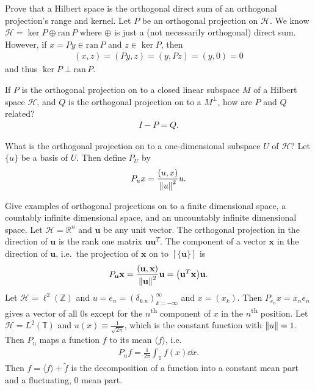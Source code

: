 \documentclass[avery5388,grid,frame]{flashcards}
\newcommand{\ran}{\mathrm{ran}\,}
\def\Rl{\mathbb{R}}
\def\hilb{\mathcal{H}}
\def\torus{\mathbb{T}}
\begin{document}
\begin{flashcard}
    {Prove that a Hilbert space is the orthogonal direct sum of an orthogonal projection's range and kernel.}
    Let $P$ be an orthogonal projection on $\hilb$.  We know $\hilb = \ker P \oplus \ran P$ where $\oplus$ is just a (not necessarily orthogonal) direct sum.  However, if $x = Py \in \ran P$ and $z \in \ker P$, then
    \begin{align*}
        (x, z) = (Py, z) = (y, Pz) = (y, 0) = 0
    \end{align*}
    and thus $\ker P \perp \ran P$.
\end{flashcard}

\begin{flashcard}
    {If $P$ is the orthogonal projection on to a closed linear subspace $M$ of a Hilbert space $\hilb$, and $Q$ is the orthogonal projection on to a $M^\perp$, how are $P$ and $Q$ related?}
    \begin{align*}
        I - P = Q.
    \end{align*}
\end{flashcard}

\begin{flashcard}
    {What is the orthogonal projection on to a one-dimensional subspace $U$ of $\hilb$?}
    Let $\{u\}$ be a basis of $U$.  Then define $P_U$ by
    \begin{align*}
        P_u x = \frac{(u,x)}{\norm{u}^2}u.
    \end{align*}
\end{flashcard}

\begin{flashcard}
    {Give examples of orthogonal projections on to a finite dimensional space, a countably infinite dimensional space, and an uncountably infinite dimensional space.}
    Let $\hilb = \Rl^n$ and $\mathbf{u}$ be any unit vector.  The orthogonal projection in the direction of $\mathbf{u}$ is the rank one matrix $\mathbf{u}\mathbf{u}^T$.  The component of a vector $\mathbf{x}$ in the direction of $\mathbf{u}$, i.e.~the projection of $\mathbf{x}$ on to $[\{\mathbf{u}\}]$ is
    \vspace{-5pt}
    \begin{align*}
        P_\mathbf{u}\mathbf{x} = \frac{(\mathbf{u}, \mathbf{x})}{\norm{\mathbf{u}}^2}\mathbf{u} = \qty(\mathbf{u}^T\mathbf{x})\mathbf{u}.
    \end{align*}
    Let $\hilb = \ell^2(\mathbb{Z})$ and $u = e_n = (\delta_{k.n})_{k=-\infty}^\infty$ and $x = (x_k)$.  Then $P_{e_n}x = x_ne_n$ gives a vector of all $0$s except for the $n$\textsuperscript{th} component of $x$ in the $n$\textsuperscript{th} position.
    Let $\hilb = L^2(\torus)$ and $u(x) \equiv \frac{1}{\sqrt{2\pi}}$, which is the constant function with $\norm{u} = 1$.  Then $P_u$ maps a function $f$ to its mean $\langle f \rangle$, i.e.
    \vspace{-5pt}
    \begin{align*}
        P_u f = \frac{1}{2\pi}\int_\torus f(x) \dd x.
    \end{align*}
    Then $f = \langle f \rangle + \tilde{f}$ is the decomposition of a function into a constant mean part and a fluctuating, $0$ mean part.
\end{flashcard}
\end{document}
